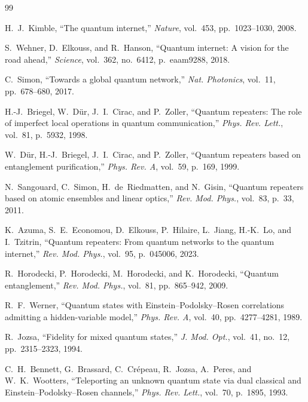 \documentclass[twocolumn]{article}
\begin{document}

\begin{thebibliography}{99}

H.~J.~Kimble, ``The quantum internet,''
\emph{Nature}, vol.~453, pp.~1023--1030, 2008.

S.~Wehner, D.~Elkouss, and R.~Hanson,
``Quantum internet: A vision for the road ahead,''
\emph{Science}, vol.~362, no.~6412, p.~eaam9288, 2018.

C.~Simon, ``Towards a global quantum network,''
\emph{Nat. Photonics}, vol.~11, pp.~678--680, 2017.

H.-J.~Briegel, W.~D\"ur, J.~I.~Cirac, and P.~Zoller,
``Quantum repeaters: The role of imperfect local operations in quantum
communication,''
\emph{Phys. Rev. Lett.}, vol.~81, p.~5932, 1998.

W.~D\"ur, H.-J.~Briegel, J.~I.~Cirac, and P.~Zoller,
``Quantum repeaters based on entanglement purification,''
\emph{Phys. Rev. A}, vol.~59, p.~169, 1999.

N.~Sangouard, C.~Simon, H.~de~Riedmatten, and N.~Gisin,
``Quantum repeaters based on atomic ensembles and linear optics,''
\emph{Rev. Mod. Phys.}, vol.~83, p.~33, 2011.

K.~Azuma, S.~E.~Economou, D.~Elkouss, P.~Hilaire, L.~Jiang,
H.-K.~Lo, and I.~Tzitrin,
``Quantum repeaters: From quantum networks to the quantum internet,''
\emph{Rev. Mod. Phys.}, vol.~95, p.~045006, 2023.

R.~Horodecki, P.~Horodecki, M.~Horodecki, and K.~Horodecki,
``Quantum entanglement,''
\emph{Rev. Mod. Phys.}, vol.~81, pp.~865--942, 2009.

R.~F.~Werner, ``Quantum states with Einstein--Podolsky--Rosen
correlations admitting a hidden-variable model,''
\emph{Phys. Rev. A}, vol.~40, pp.~4277--4281, 1989.

R.~Jozsa, ``Fidelity for mixed quantum states,''
\emph{J. Mod. Opt.}, vol.~41, no.~12, pp.~2315--2323, 1994.

C.~H.~Bennett, G.~Brassard, C.~Cr\'epeau, R.~Jozsa, A.~Peres, and
W.~K.~Wootters,
``Teleporting an unknown quantum state via dual classical and
Einstein--Podolsky--Rosen channels,''
\emph{Phys. Rev. Lett.}, vol.~70, p.~1895, 1993.


\end{thebibliography}
\end{document}

